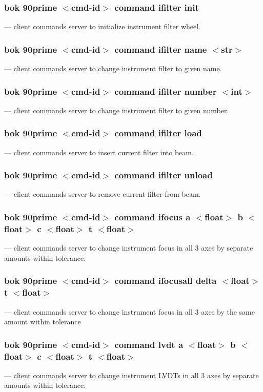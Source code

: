 \documentclass[12pt,twoside]{article}
\begin{document}
\subsubsection{bok 90prime $<$cmd-id$>$ command ifilter init}
  --- client commands server to initialize instrument filter wheel.

\subsubsection{bok 90prime $<$cmd-id$>$ command ifilter name $<$str$>$}
  --- client commands server to change instrument filter to given name.

\subsubsection{bok 90prime $<$cmd-id$>$ command ifilter number $<$int$>$}
  --- client commands server to change instrument filter to given number.
 
\subsubsection{bok 90prime $<$cmd-id$>$ command ifilter load}
  --- client commands server to insert current filter into beam.

\subsubsection{bok 90prime $<$cmd-id$>$ command ifilter unload}
  --- client commands server to remove current filter from beam.

\subsubsection{bok 90prime $<$cmd-id$>$ command ifocus a $<$float$>$ b $<$float$>$ c $<$float$>$ t $<$float$>$}
  --- client commands server to change instrument focus in all 3 axes by separate amounts within tolerance.

\subsubsection{bok 90prime $<$cmd-id$>$ command ifocusall delta $<$float$>$ t $<$float$>$}
  --- client commands server to change instrument focus in all 3 axes by the same amount within tolerance

\subsubsection{bok 90prime $<$cmd-id$>$ command lvdt a $<$float$>$ b $<$float$>$ c $<$float$>$ t $<$float$>$}
  --- client commands server to change instrument LVDTs in all 3 axes by separate amounts within tolerance.
\end{document}
